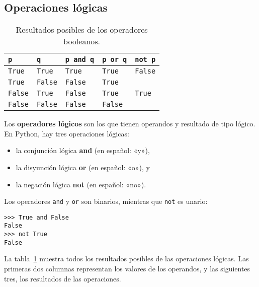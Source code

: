 \subsection{Operaciones lógicas}

\begin{table}
  \centering
  \begin{tabular}{*{5}{l}}
    \toprule
      \lstinline!p!     & \lstinline!q!       & \lstinline!p and q! & \lstinline!p or q! & \lstinline!not p! \\
    \midrule
      \lstinline!True!  & \lstinline!True!    & \lstinline!True!    & \lstinline!True!   & \lstinline!False! \\
      \lstinline!True!  & \lstinline!False!   & \lstinline!False!   & \lstinline!True!   &                   \\
      \lstinline!False! & \lstinline!True!    & \lstinline!False!   & \lstinline!True!   & \lstinline!True!  \\
      \lstinline!False! & \lstinline!False!   & \lstinline!False!   & \lstinline!False!  &                   \\
    \bottomrule
  \end{tabular}
  \caption{Resultados posibles de los operadores booleanos.}
  \label{tbl:operadores-booleanos}
\end{table}

Los \textbf{operadores lógicos} son los que tienen operandos y resultado
de tipo lógico.
En Python, hay tres operaciones lógicas:

\begin{itemize}
 \item la conjunción lógica \textbf{and} (en español: «y»),
 \item la disyunción lógica \textbf{or} (en español: «o»), y
 \item la negación lógica \textbf{not} (en español: «no»).
\end{itemize}

Los operadores \lstinline!and! y \lstinline!or! son binarios, mientras
que \lstinline!not! es unario:
\begin{lstlisting}
>>> True and False
False
>>> not True
False
\end{lstlisting}

La tabla~\ref{tbl:operadores-booleanos} muestra todos los resultados posibles de las
operaciones lógicas. Las primeras dos columnas representan los valores
de los operandos, y las siguientes tres, los resultados de las
operaciones.

